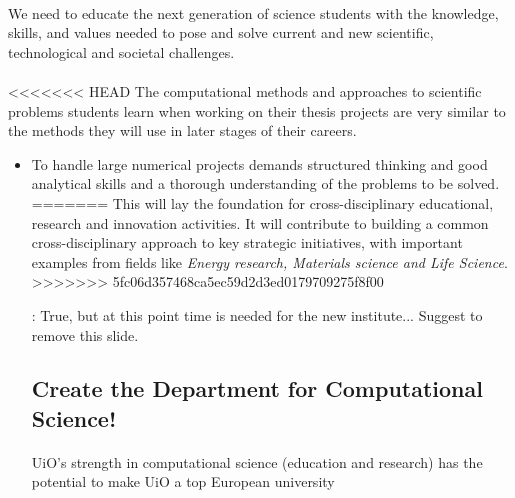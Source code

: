 \documentclass[%
<<<<<<< HEAD
oneside,                 %
final,                   %
=======
twoside,                 %
final,                   %
>>>>>>> 5fc06d357468ca5ec59d2d3ed0179709275f8f00
10pt]{article}
\newcommand{\shortinlinecomment}[3]{{\color{red}{\bf #1}: #2}}
\begin{document}
\begin{itemize}
\paragraph{}
We need to educate the next generation of 
science students with the knowledge, skills, and values needed to pose
and solve current and new scientific, technological and societal
challenges.



\paragraph{}
<<<<<<< HEAD
The computational methods and approaches to scientific problems students learn
when working on their thesis projects are very similar to the methods
they will use in later stages of their careers.
\begin{itemize}
\item To handle large numerical projects demands structured thinking and good analytical skills and a thorough understanding of the problems to be solved.
=======
This will lay the foundation for cross-disciplinary
educational, research and innovation activities. It will contribute to building a common cross-disciplinary
approach to key strategic initiatives, with important examples from fields like  \emph{Energy research, Materials science and  Life Science}.
>>>>>>> 5fc06d357468ca5ec59d2d3ed0179709275f8f00









\shortinlinecomment{hpl 3}{ True, but at this point time is needed for the new institute... Suggest to remove this slide. }{ True, but at this }

\subsection*{Create the Department for Computational Science!}


\paragraph{}
UiO's strength in computational science (education and research)
has the potential to make UiO a top European university





\end{itemize}
\end{itemize}
\end{document}
